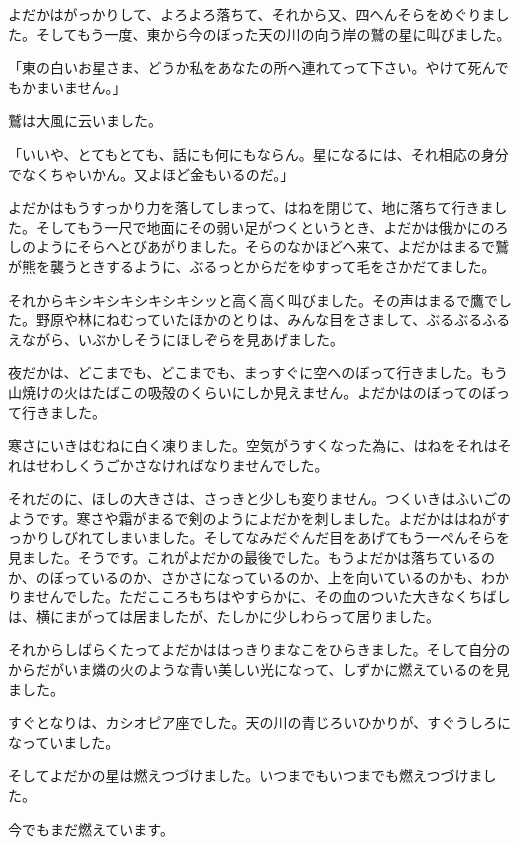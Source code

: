 \documentclass[a4paper, platex, dvipdfmx]{jsarticle}
\begin{document}
よだかはがっかりして、よろよろ落ちて、それから又、四へんそらをめぐりました。そしてもう一度、東から今のぼった天の川の向う岸の鷲の星に叫びました。

「東の白いお星さま、どうか私をあなたの所へ連れてって下さい。やけて死んでもかまいません。」

鷲は大風に云いました。

「いいや、とてもとても、話にも何にもならん。星になるには、それ相応の身分でなくちゃいかん。又よほど金もいるのだ。」

よだかはもうすっかり力を落してしまって、はねを閉じて、地に落ちて行きました。そしてもう一尺で地面にその弱い足がつくというとき、よだかは俄かにのろしのようにそらへとびあがりました。そらのなかほどへ来て、よだかはまるで鷲が熊を襲うときするように、ぶるっとからだをゆすって毛をさかだてました。

それからキシキシキシキシキシッと高く高く叫びました。その声はまるで鷹でした。野原や林にねむっていたほかのとりは、みんな目をさまして、ぶるぶるふるえながら、いぶかしそうにほしぞらを見あげました。

夜だかは、どこまでも、どこまでも、まっすぐに空へのぼって行きました。もう山焼けの火はたばこの吸殻のくらいにしか見えません。よだかはのぼってのぼって行きました。

寒さにいきはむねに白く凍りました。空気がうすくなった為に、はねをそれはそれはせわしくうごかさなければなりませんでした。

それだのに、ほしの大きさは、さっきと少しも変りません。つくいきはふいごのようです。寒さや霜がまるで剣のようによだかを刺しました。よだかははねがすっかりしびれてしまいました。そしてなみだぐんだ目をあげてもう一ぺんそらを見ました。そうです。これがよだかの最後でした。もうよだかは落ちているのか、のぼっているのか、さかさになっているのか、上を向いているのかも、わかりませんでした。ただこころもちはやすらかに、その血のついた大きなくちばしは、横にまがっては居ましたが、たしかに少しわらって居りました。

それからしばらくたってよだかははっきりまなこをひらきました。そして自分のからだがいま燐の火のような青い美しい光になって、しずかに燃えているのを見ました。

すぐとなりは、カシオピア座でした。天の川の青じろいひかりが、すぐうしろになっていました。

そしてよだかの星は燃えつづけました。いつまでもいつまでも燃えつづけました。

今でもまだ燃えています。
\end{document}
